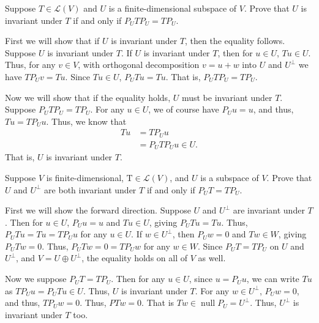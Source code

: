 \documentclass[12 pt, letterpaper]{hmcpset}
\begin{document}
\pagebreak

\begin{problem}[9]
	Suppose $T \in \mathcal{L}(V)$ and $U$ is a finite-dimensional subspace of $V$. Prove that $U$ is invariant under $T$ if and only if $P_{U} T P_{U} = T P_{U}$.
\end{problem}

\begin{solution}
	First we will show that if $U$ is invariant under $T$, then the equality follows. Suppose $U$ is invariant under $T$. If $U$ is invariant under $T$, then for $u \in U$, $Tu \in U$. Thus, for any $v \in V$, with orthogonal decomposition $v = u + w$ into $U$ and $U^{\perp}$ we have $T P_{U} v = T u$. Since $Tu \in U$, $P_{U} T u = Tu$. That is, $P_{U} T P_{U} = T P_{U}$.

	Now we will show that if the equality holds, $U$ must be invariant under $T$. Suppose $P_{U} T P_{U} = T P_{U}$. For any $u \in U$, we of course have $P_{U} u = u$, and thus, $Tu = T P_{U} u$. Thus, we know that
	\[
		\begin{split}
			Tu & = T P_{U} u \\
			   & = P_{U} T P_{U} u \in U.
		\end{split}
	\]
	That is, $U$ is invariant under $T$.
\end{solution}

\pagebreak

\begin{problem}[10]
	Suppose $V$ is finite-dimensional, $\mathrm{T} \in \mathcal{L}(V)$, and $U$ is a subspace of $V$. Prove that $U$ and $U^{\perp}$ are both invariant under $T$ if and only if $P_{U} T = T P_{U}$.
\end{problem}

\begin{solution}
	First we will show the forward direction. Suppose $U$ and $U^{\perp}$ are invariant under $T$. Then for $u \in U$, $P_{U} u = u$ and $T u \in U$, giving $P_{U} T u = Tu$. Thus, $P_{U} T u = T u = T P_{U} u$ for any $u \in U$. If $w \in U^{\perp}$, then $P_{U} w = 0$ and $T w \in W$, giving $P_{U} T w = 0$. Thus, $P_{U} T w = 0 = T P_{U} w$ for any $w \in W$. Since $P_{U} T = T P_{U}$ on $U$ and $U^{\perp}$, and $V = U \oplus U^{\perp}$, the equality holds on all of $V$ as well.

	Now we suppose $P_{U} T = T P_{U}$. Then for any $u \in U$, since $u = P_{U} u$, we can write $Tu$ as $T P_{U} u = P_{U} T u \in U$. Thus, $U$ is invariant under $T$. For any $w \in U^{\perp}$, $P_{U} w = 0$, and thus, $T P_{U} w = 0$. Thus,  $P T w = 0$. That is $T w \in \operatorname{null} P_{U} = U^{\perp}$. Thus, $U^{\perp}$ is invariant under $T$ too.
\end{solution}
\end{document}
